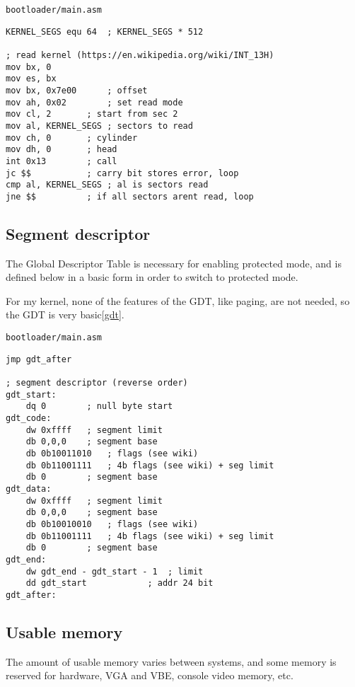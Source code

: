 \documentclass{article}
\begin{document}
\begin{verbatim}
bootloader/main.asm
\end{verbatim}
\begin{verbatim}
KERNEL_SEGS equ 64	; KERNEL_SEGS * 512

; read kernel (https://en.wikipedia.org/wiki/INT_13H)
mov bx, 0
mov es, bx
mov bx, 0x7e00		; offset
mov ah, 0x02		; set read mode
mov cl, 2		; start from sec 2
mov al, KERNEL_SEGS	; sectors to read
mov ch, 0		; cylinder
mov dh, 0		; head
int 0x13		; call
jc $$			; carry bit stores error, loop
cmp al, KERNEL_SEGS	; al is sectors read
jne $$			; if all sectors arent read, loop
\end{verbatim}

\subsection{Segment descriptor}

The Global Descriptor Table is necessary for enabling protected mode\cite{gdt},
and is defined below in a basic form in order to switch to protected mode.

For my kernel, none of the features of the GDT, like paging\cite{gdt page},
are not needed, so the GDT is very basic\ref{gdt}.

\begin{verbatim}
bootloader/main.asm
\end{verbatim}
\begin{verbatim}
jmp gdt_after

; segment descriptor (reverse order)
gdt_start:
	dq 0		; null byte start
gdt_code:
	dw 0xffff	; segment limit
	db 0,0,0	; segment base
	db 0b10011010	; flags (see wiki)
	db 0b11001111	; 4b flags (see wiki) + seg limit
	db 0		; segment base
gdt_data:
	dw 0xffff	; segment limit
	db 0,0,0	; segment base
	db 0b10010010	; flags (see wiki)
	db 0b11001111	; 4b flags (see wiki) + seg limit
	db 0		; segment base
gdt_end:
	dw gdt_end - gdt_start - 1	; limit
	dd gdt_start			; addr 24 bit
gdt_after:
\end{verbatim}

\subsection{Usable memory}

The amount of usable memory varies between systems,
and some memory is reserved for hardware, VGA and VBE,
console video memory, etc.
\end{document}
